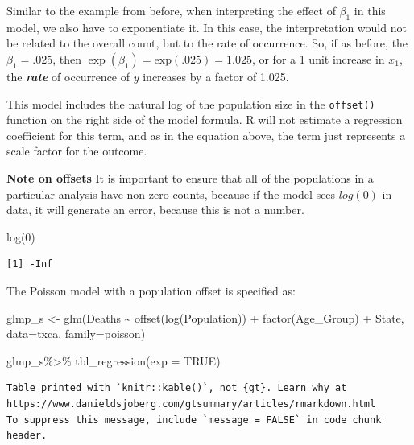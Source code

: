 \documentclass[
  letterpaper,
  DIV=11,
  numbers=noendperiod]{scrreprt}
\newenvironment{Shaded}{\begin{snugshade}}{\end{snugshade}}
\newcommand{\AttributeTok}[1]{\textcolor[rgb]{0.40,0.45,0.13}{#1}}
\newcommand{\ConstantTok}[1]{\textcolor[rgb]{0.56,0.35,0.01}{#1}}
\newcommand{\DecValTok}[1]{\textcolor[rgb]{0.68,0.00,0.00}{#1}}
\newcommand{\FunctionTok}[1]{\textcolor[rgb]{0.28,0.35,0.67}{#1}}
\newcommand{\NormalTok}[1]{\textcolor[rgb]{0.00,0.23,0.31}{#1}}
\newcommand{\OtherTok}[1]{\textcolor[rgb]{0.00,0.23,0.31}{#1}}
\newcommand{\SpecialCharTok}[1]{\textcolor[rgb]{0.37,0.37,0.37}{#1}}
\begin{document}
Similar to the example from before, when interpreting the effect of
\(\beta_1\) in this model, we also have to exponentiate it. In this
case, the interpretation would not be related to the overall count, but
to the rate of occurrence. So, if as before, the
\(\beta_1 = \text{.025}\), then
\(\exp(\beta_1) = \text{exp}(\text{.025}) = \text{1.025}\), or for a 1
unit increase in \(x_1\), the \textbf{\emph{rate}} of occurrence of
\(y\) increases by a factor of 1.025.

This model includes the natural log of the population size in the
\texttt{offset()} function on the right side of the model formula. R
will not estimate a regression coefficient for this term, and as in the
equation above, the term just represents a scale factor for the outcome.

\textbf{Note on offsets} It is important to ensure that all of the
populations in a particular analysis have non-zero counts, because if
the model sees \(log(0)\) in data, it will generate an error, because
this is not a number.

\begin{Shaded}
\begin{Highlighting}[]
\FunctionTok{log}\NormalTok{(}\DecValTok{0}\NormalTok{)}
\end{Highlighting}
\end{Shaded}

\begin{verbatim}
[1] -Inf
\end{verbatim}

The Poisson model with a population offset is specified as:

\begin{Shaded}
\begin{Highlighting}[]
\NormalTok{glmp\_s }\OtherTok{\textless{}{-}} \FunctionTok{glm}\NormalTok{(Deaths }\SpecialCharTok{\textasciitilde{}} \FunctionTok{offset}\NormalTok{(}\FunctionTok{log}\NormalTok{(Population)) }\SpecialCharTok{+} \FunctionTok{factor}\NormalTok{(Age\_Group) }\SpecialCharTok{+}\NormalTok{ State,}
              \AttributeTok{data=}\NormalTok{txca,}
              \AttributeTok{family=}\NormalTok{poisson)}

\NormalTok{glmp\_s}\SpecialCharTok{\%\textgreater{}\%}
  \FunctionTok{tbl\_regression}\NormalTok{(}\AttributeTok{exp =} \ConstantTok{TRUE}\NormalTok{)}
\end{Highlighting}
\end{Shaded}

\begin{verbatim}
Table printed with `knitr::kable()`, not {gt}. Learn why at
https://www.danieldsjoberg.com/gtsummary/articles/rmarkdown.html
To suppress this message, include `message = FALSE` in code chunk header.
\end{verbatim}
\end{document}
